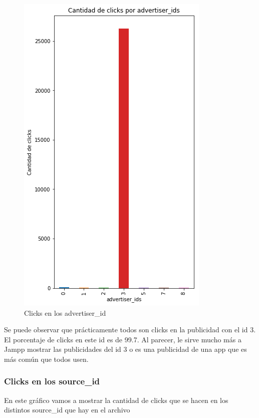 \documentclass[a4paper, 12pt]{article}
\begin{document}
		
		\begin{figure}[H]
			\centering
			\includegraphics[scale=0.5]{images/clicks/clicks_advertiser_id.png}
			\caption{Clicks en los advertiser\_id}
		\end{figure}
		

		 Se puede observar que prácticamente todos son clicks en la publicidad con el id 3. El porcentaje de clicks en este id es de 99.7. Al parecer, le sirve mucho más a Jampp mostrar las publicidades del id 3 o es una publicidad de una app que es más común que todos usen.

	\subsubsection{Clicks en los source\_id}
		 En este gráfico vamos a mostrar la cantidad de clicks que se hacen en los distintos source\_id que hay en el archivo
		
		
		
\end{document}
